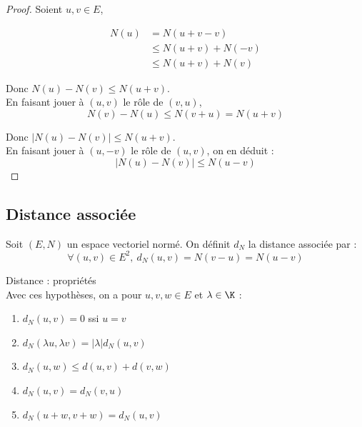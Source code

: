 
\begin{proof}
    Soient $u, v \in E$,

    \begin{align*}
    N(u) &= N(u + v - v) \\
         &\leqslant N(u + v) + N(-v) \\
         &\leqslant N(u + v) + N(v)
    \end{align*}

    Donc $N(u) - N(v) \leqslant N(u + v)$. \\

    En faisant jouer à $(u, v)$ le rôle de $(v, u)$, 
    $$ N(v) - N(u) \leqslant N(v + u) = N(u + v)$$

    Donc $|N(u) - N(v)| \leqslant N(u + v)$. \\

    En faisant jouer à $(u, -v)$ le rôle de $(u, v)$, on en déduit : 
    $$|N(u) - N(v)| \leqslant N(u - v)$$
\end{proof}


\subsection{Distance associée}

\begin{definition}{}{}
    Soit $(E, N)$ un espace vectoriel normé.
    On définit $d_N$ la distance associée par :
    $$\forall (u, v) \in E^2,~ d_N(u, v) = N(v - u) = N(u - v)$$
\end{definition}

\begin{proposition}{Distance : propriétés}{}
    \\Avec ces hypothèses, on a pour $u, v, w \in E$ et $\lambda \in \K$ :

    \begin{enumerate}
        \item $d_N(u, v) = 0$ ssi $u = v$
        \item $d_N(\lambda u, \lambda v) = |\lambda| d_N(u, v)$
        \item $d_N(u, w) \leqslant d(u, v) + d(v, w)$
        \item $d_N (u, v) = d_N (v, u)$
        \item $d_N (u + w, v + w) = d_N (u, v)$
    \end{enumerate}
\end{proposition}

